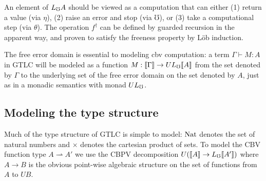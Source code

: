 %
An element of $L_\mho A$ should be viewed as a computation that can either (1)
return a value (via $\eta$), (2) raise an error and stop (via $\mho$), or (3)
take a computational step (via $\theta$).
%
The operation $f^\dagger$ can be defined by guarded recursion in the
apparent way, and proven to satisfy the freeness property by L\"ob
induction.
%
%




The free error domain is essential to modeling cbv computation: a term
$\Gamma \vdash M : A$ in GTLC will be modeled as a function $M :
\llbracket {\Gamma} \rrbracket \to UL_\mho \llbracket {A} \rrbracket$ from the set denoted by $\Gamma$ to the
underlying set of the free error domain on the set denoted by $A$,
just as in a monadic semantics with monad $UL_\mho$.

\subsection{Modeling the type structure}\label{sec:dynamic-type}
Much of the type structure of GTLC is simple to model: $\text{Nat}$ denotes
the set of natural numbers and $\times$ denotes the cartesian product
of sets. To model the CBV function type $A \rightharpoonup A'$ we use
the CBPV decomposition $U(\llbracket {A} \rrbracket \to L_\mho \llbracket {A'} \rrbracket)$ where $A \to B$
is the obvious point-wise algebraic structure on the set of functions
from $A$ to $UB$.

